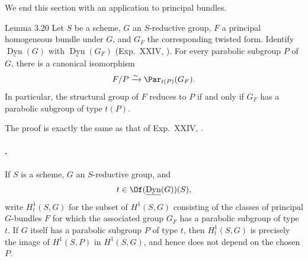 We end this section with an application to principal bundles.

\begin{sgastatement}{Lemma 3.20}
Let \(S\) be a scheme, \(G\) an \(S\)-reductive group, \(F\) a principal
homogeneous bundle under \(G\), and \(G_F\) the corresponding twisted form.
Identify \(\underline{\operatorname{Dyn}}(G)\) with
\(\underline{\operatorname{Dyn}}(G_F)\) \textup{(Exp.\ XXIV, )}.
For every parabolic subgroup \(P\) of \(G\), there is a canonical
isomorphism
\[
 F/P\xrightarrow{\sim}\Par_{t(P)}(G_F).
\]
In particular, the structural group of \(F\) reduces to \(P\) if and only
if \(G_F\) has a parabolic subgroup of type \(t(P)\).
\end{sgastatement}

The proof is exactly the same as that of Exp.\ XXIV, .

\paragraph{.}
If \(S\) is a scheme, \(G\) an \(S\)-reductive group, and
\[
 t\in\Of(\underline{\operatorname{Dyn}}(G))(S),
\]
write \(H^1_t(S,G)\) for the subset of \(H^1(S,G)\) consisting of the
classes of principal \(G\)-bundles \(F\) for which the associated group
\(G_F\) has a parabolic subgroup of type \(t\).  If \(G\) itself has a
parabolic subgroup \(P\) of type \(t\), then \(H^1_t(S,G)\) is precisely
the image of \(H^1(S,P)\) in \(H^1(S,G)\), and hence does not depend on
the chosen \(P\).

